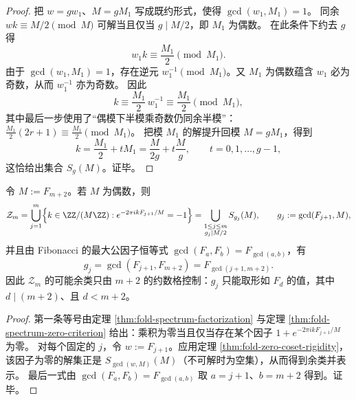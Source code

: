 \begin{proof}
把 \(w=gw_1\)、\(M=gM_1\) 写成既约形式，使得 \(\gcd(w_1,M_1)=1\)。
同余 \(wk\equiv M/2\pmod M\) 可解当且仅当 \(g\mid M/2\)，即 \(M_1\) 为偶数。
在此条件下约去 \(g\) 得
\[
w_1k\equiv \frac{M_1}{2}\pmod{M_1}.
\]
由于 \(\gcd(w_1,M_1)=1\)，存在逆元 \(w_1^{-1}\pmod{M_1}\)。又 \(M_1\) 为偶数蕴含 \(w_1\) 必为奇数，从而 \(w_1^{-1}\) 亦为奇数。
因此
\[
k\equiv \frac{M_1}{2}\,w_1^{-1}\equiv \frac{M_1}{2}\pmod{M_1},
\]
其中最后一步使用了“偶模下半模乘奇数仍同余半模”：\(\frac{M_1}{2}(2r+1)\equiv \frac{M_1}{2}\pmod{M_1}\)。
把模 \(M_1\) 的解提升回模 \(M=gM_1\)，得到
\[
k=\frac{M_1}{2}+tM_1=\frac{M}{2g}+t\frac{M}{g},\qquad t=0,1,\dots,g-1,
\]
这恰给出集合 \(S_g(M)\)。证毕。
\end{proof}

\begin{corollary}\label{cor:fold-zero-coset-union}
令 \(M:=F_{m+2}\)。若 \(M\) 为偶数，则
\[
\mathcal{Z}_m=\bigcup_{j=1}^{m}\Bigl\{k\in\ZZ/(M\ZZ):e^{-2\pi i kF_{j+1}/M}=-1\Bigr\}
=\bigcup_{\substack{1\le j\le m\\ g_j\mid M/2}} S_{g_j}(M),
\qquad g_j:=\gcd(F_{j+1},M),
\]
并且由 Fibonacci 的最大公因子恒等式 \(\gcd(F_a,F_b)=F_{\gcd(a,b)}\)，有
\[
g_j=\gcd(F_{j+1},F_{m+2})=F_{\gcd(j+1,m+2)}.
\]
因此 \(\mathcal{Z}_m\) 的可能余类只由 \(m+2\) 的约数格控制：\(g_j\) 只能取形如 \(F_d\) 的值，其中 \(d\mid(m+2)\)、且 \(d<m+2\)。
\end{corollary}

\begin{proof}
第一条等号由定理 \ref{thm:fold-spectrum-factorization} 与定理 \ref{thm:fold-spectrum-zero-criterion} 给出：乘积为零当且仅当存在某个因子 \(1+e^{-2\pi i kF_{j+1}/M}\) 为零。
对每个固定的 \(j\)，令 \(w:=F_{j+1}\)。应用定理 \ref{thm:fold-zero-coset-rigidity}，该因子为零的解集正是 \(S_{\gcd(w,M)}(M)\)（不可解时为空集），从而得到余类并表示。
最后一式由 \(\gcd(F_a,F_b)=F_{\gcd(a,b)}\) 取 \(a=j+1\)、\(b=m+2\) 得到。证毕。
\end{proof}

